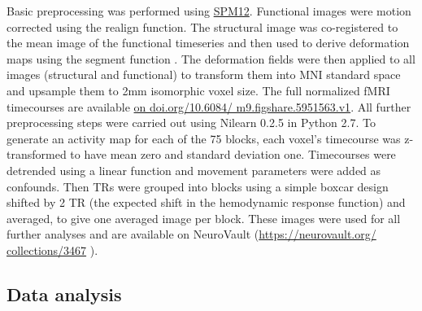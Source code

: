 \documentclass[fleqn,10pt]{SelfArx} %
\begin{document}
Basic preprocessing was performed using \href{http://www.fil.ion.ucl.ac.uk/spm}{SPM12}. Functional images were motion corrected using the realign function. The structural image was co-registered to the mean image of the functional timeseries and then used to derive deformation maps using the segment function \citep{Ashburner_2005}. The deformation fields were then applied to all images (structural and functional) to transform them into MNI standard space and upsample them to 2mm isomorphic voxel size. The full normalized fMRI timecourses are available \href{https://doi.org/10.6084/m9.figshare.5951563.v1}{on doi.org/10.6084/ m9.figshare.5951563.v1}. All further preprocessing steps were carried out using Nilearn 0.2.5 \citep{Abraham_2014} in Python 2.7. To generate an activity map for each of the 75 blocks, each voxel's timecourse was z-transformed to have mean zero and standard deviation one. Timecourses were detrended using a linear function and movement parameters were added as confounds. Then TRs were grouped into blocks using a simple boxcar design shifted by 2 TR (the expected shift in the hemodynamic response function) and averaged, to give one averaged image per block. These images were used for all further analyses and are available on NeuroVault (\href{https://neurovault.org/collections/3467}{https://neurovault.org/ collections/3467} ). 

\subsection{Data analysis}
\end{document}
